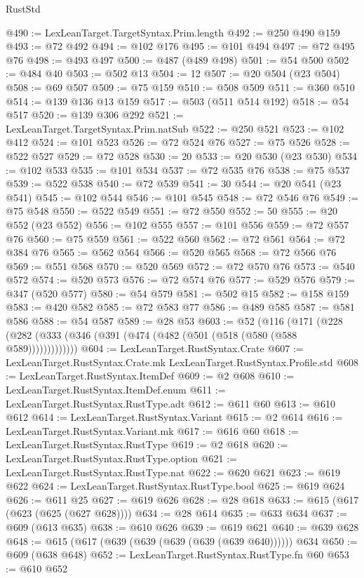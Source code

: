 \begin{lexlean}{RustStd}
\begin{coremodule}
@490 := LexLeanTarget.TargetSyntax.Prim.length
@492 := @250 @490 @159
@493 := @72 @492
@494 := @102 @176
@495 := @101 @494
@497 := @72 @495 @76
@498 := @493 @497
@500 := @487 (@489 @498)
@501 := @54 @500
@502 := @484 @40
@503 := @502 @13
@504 := 12
@507 := @20 @504 (@23 @504)
@508 := @69 @507
@509 := @75 @159
@510 := @508 @509
@511 := @360 @510
@514 := @139 @136 @13 @159
@517 := @503 (@511 @514 @192)
@518 := @54 @517
@520 := @139 @306 @292
@521 := LexLeanTarget.TargetSyntax.Prim.natSub
@522 := @250 @521
@523 := @102 @412
@524 := @101 @523
@526 := @72 @524 @76
@527 := @75 @526
@528 := @522 @527
@529 := @72 @528
@530 := 20
@533 := @20 @530 (@23 @530)
@534 := @102 @533
@535 := @101 @534
@537 := @72 @535 @76
@538 := @75 @537
@539 := @522 @538
@540 := @72 @539
@541 := 30
@544 := @20 @541 (@23 @541)
@545 := @102 @544
@546 := @101 @545
@548 := @72 @546 @76
@549 := @75 @548
@550 := @522 @549
@551 := @72 @550
@552 := 50
@555 := @20 @552 (@23 @552)
@556 := @102 @555
@557 := @101 @556
@559 := @72 @557 @76
@560 := @75 @559
@561 := @522 @560
@562 := @72 @561
@564 := @72 @384 @76
@565 := @562 @564
@566 := @520 @565
@568 := @72 @566 @76
@569 := @551 @568
@570 := @520 @569
@572 := @72 @570 @76
@573 := @540 @572
@574 := @520 @573
@576 := @72 @574 @76
@577 := @529 @576
@579 := @347 (@520 @577)
@580 := @54 @579
@581 := @502 @15
@582 := @158 @159
@583 := @420 @582
@585 := @72 @583 @77
@586 := @489 @585
@587 := @581 @586
@588 := @54 @587
@589 := @28 @53
@603 := @52
    (@116 (@171 (@228 (@282 (@333 (@346 (@391 (@474 (@482 (@501 (@518 (@580 (@588 @589)))))))))))))
@604 := LexLeanTarget.RustSyntax.Crate
@607 := LexLeanTarget.RustSyntax.Crate.mk LexLeanTarget.RustSyntax.Profile.std
@608 := LexLeanTarget.RustSyntax.ItemDef
@609 := @2 @608
@610 := LexLeanTarget.RustSyntax.ItemDef.enum
@611 := LexLeanTarget.RustSyntax.RustType.adt
@612 := @611 @60
@613 := @610 @612
@614 := LexLeanTarget.RustSyntax.Variant
@615 := @2 @614
@616 := LexLeanTarget.RustSyntax.Variant.mk
@617 := @616 @60
@618 := LexLeanTarget.RustSyntax.RustType
@619 := @2 @618
@620 := LexLeanTarget.RustSyntax.RustType.option
@621 := LexLeanTarget.RustSyntax.RustType.nat
@622 := @620 @621
@623 := @619 @622
@624 := LexLeanTarget.RustSyntax.RustType.bool
@625 := @619 @624
@626 := @611 @25
@627 := @619 @626
@628 := @28 @618
@633 := @615 (@617 (@623 (@625 (@627 @628))))
@634 := @28 @614
@635 := @633 @634
@637 := @609 (@613 @635)
@638 := @610 @626
@639 := @619 @621
@640 := @639 @628
@648 := @615 (@617 (@639 (@639 (@639 (@639 (@639 @640)))))) @634
@650 := @609 (@638 @648)
@652 := LexLeanTarget.RustSyntax.RustType.fn @60
@653 := @610 @652

\end{coremodule}
\end{lexlean}
